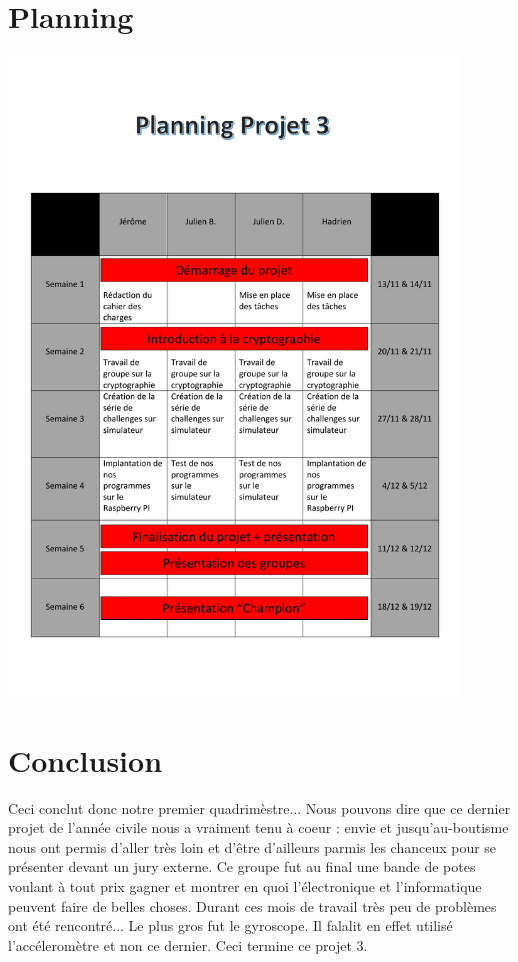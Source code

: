 \section{Planning}
\begin{center}
    \includegraphics[width=12cm]{PlanningP3.pdf}
\end{center}

\section{Conclusion}
Ceci conclut donc notre premier quadrimèstre... Nous pouvons dire que ce dernier projet de l'année civile nous a vraiment tenu à coeur : envie et jusqu'au-boutisme nous ont permis d'aller très loin et d'être d'ailleurs parmis les chanceux pour se présenter devant un jury externe. Ce groupe fut au final une bande de potes voulant à tout prix gagner et montrer en quoi l'électronique et l'informatique peuvent faire de belles choses. Durant ces mois de travail très peu de problèmes ont été rencontré... Le plus gros fut le gyroscope. Il falalit en effet utilisé l'accéleromètre et non ce dernier. Ceci termine ce projet 3.  